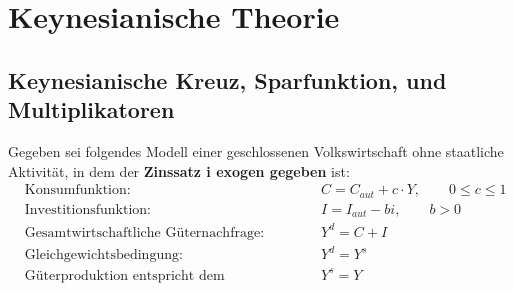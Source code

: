\documentclass{scrartcl}
\begin{document}
\newpage
\section{Keynesianische Theorie}
\subsection{Keynesianische Kreuz, Sparfunktion, und Multiplikatoren}
Gegeben sei folgendes Modell einer
geschlossenen Volkswirtschaft ohne staatliche Aktivität, in dem der \textbf{Zinssatz i exogen gegeben} ist:
\begin{align*}
&\text{Konsumfunktion: } &\quad& C = C_{aut} + c\cdot Y,\qquad 0\leq c \leq 1\\
&\text{Investitionsfunktion: } &\quad&I = I_{aut}-bi,\qquad b>0\\
&\text{Gesamtwirtschaftliche Güternachfrage: } &\quad&Y^d = C + I\\
&\text{Gleichgewichtsbedingung: } &\quad&Y^d = Y^s\\
&\text{Güterproduktion entspricht dem Volkseinkommen: } &\quad& Y^s = Y
\end{align*}
\end{document}
